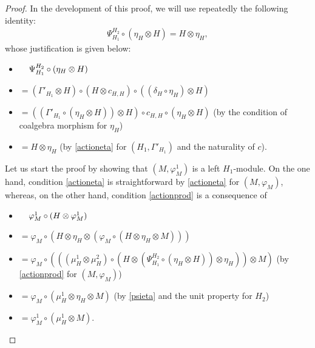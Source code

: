 \documentclass[11pt,reqno]{amsart}
\theoremstyle{plain}%
\theoremstyle{definition}
\theoremstyle{remark}
\begin{document}
\begin{proof}
	In the development of this proof, we will use repeatedly the following identity:
	\begin{gather}\label{psieta}
		\Psi_{H_{1}}^{H_{2}}\circ(\eta_{H}\otimes H)=H\otimes\eta_{H},
	\end{gather}
	whose justification is given below:
	\begin{itemize}
		\itemindent=-32pt 
		\item[ ]$\hspace{0.38cm}\Psi_{H_{1}}^{H_{2}}\circ(\eta_{H}\otimes H)$
		\item[]$=(\Gamma'_{H_{1}}\otimes H)\circ(H\otimes c_{H,H})\circ((\delta_{H}\circ\eta_{H})\otimes H)$
		\item[]$=((\Gamma'_{H_{1}}\circ(\eta_{H}\otimes H))\otimes H)\circ c_{H,H}\circ(\eta_{H}\otimes H)$ {\footnotesize (by the condition of coalgebra morphism for $\eta_{H}$)} 
		\item[]$=H\otimes\eta_{H}$ {\footnotesize (by \eqref{actioneta} for $(H_{1},\Gamma'_{H_{1}})$ and the naturality of $c$)}.
	\end{itemize}
	
	Let us start the proof by showing that $(M,\varphi_{M}^{1})$ is a left $H_{1}$-module. On the one hand, condition \eqref{actioneta} is straightforward by \eqref{actioneta} for $(M,\varphi_{M})$, whereas, on the other hand, condition \eqref{actionprod} is a consequence of
	\begin{itemize}
		\itemindent=-32pt 
		\item[ ]$\hspace{0.38cm}\varphi_{M}^{1}\circ(H\otimes\varphi_{M}^{1})$
		\item[] $=\varphi_{M}\circ(H\otimes\eta_{H}\otimes(\varphi_{M}\circ(H\otimes\eta_{H}\otimes M)))$
		\item[] $=\varphi_{M}\circ(((\mu_{H}^{1}\otimes\mu_{H}^{2})\circ(H\otimes (\Psi_{H_{1}}^{H_{2}}\circ(\eta_{H}\otimes H))\otimes \eta_{H}))\otimes M)$ {\footnotesize (by \eqref{actionprod} for $(M,\varphi_{M})$)}
		\item[] $=\varphi_{M}\circ(\mu_{H}^{1}\otimes\eta_{H}\otimes M)$ {\footnotesize (by \eqref{psieta} and the unit property for $H_{2}$)}
		\item[] $=\varphi_{M}^{1}\circ(\mu_{H}^{1}\otimes M).$ 
	\end{itemize}
	

\end{proof}
\end{document}
